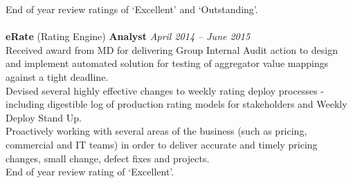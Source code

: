 \documentclass[11pt]{article}
\begin{document}
\begin{description}
\textbullet \quad End of year review ratings of `Excellent' and `Outstanding'.
\\\\
\textbf{eRate} (Rating Engine) \textbf{Analyst} \emph{April 2014 -- June 2015}\\
\textbullet \quad Received award from MD for delivering Group Internal Audit action to design and implement automated solution for testing of aggregator value mappings against a tight deadline.\\
\textbullet \quad Devised several highly effective changes to weekly rating deploy processes - including digestible log of production rating models for stakeholders and Weekly Deploy Stand Up. \\
\textbullet \quad Proactively working with several areas of the business (such as pricing, commercial and IT teams) in order to deliver accurate and timely pricing changes, small change, defect fixes and projects.\\
\textbullet \quad End of year review rating of `Excellent'.
\end{description}
\end{document}
